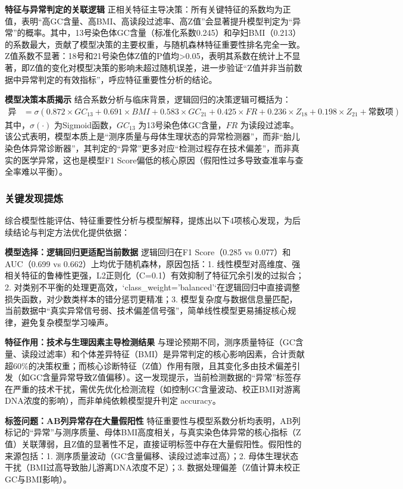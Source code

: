 \documentclass[withoutpreface,bwprint]{cumcmthesis} %
\begin{document}
\textbf{特征与异常判定的关联逻辑}
正相关特征主导决策：所有关键特征的系数均为正值，表明“高GC含量、高BMI、高读段过滤率、高Z值”会显著提升模型判定为“异常”的概率。其中，13号染色体GC含量（标准化系数0.245）和孕妇BMI（0.213）的系数最大，贡献了模型决策的主要权重，与随机森林特征重要性排名完全一致。  
Z值系数不显著：18号和21号染色体Z值的P值均>0.05，表明其系数在统计上不显著，即Z值的变化对模型决策的影响未超过随机误差，进一步验证“Z值并非当前数据中异常判定的有效指标”，呼应特征重要性分析的结论。


\textbf{模型决策本质揭示}
结合系数分析与临床背景，逻辑回归的决策逻辑可概括为：  
\begin{align}
\text{异常概率} &= \sigma( 0.872 \times GC_{13} + 0.691 \times BMI + 0.583 \times GC_{21} + 0.425 \times FR + 0.236 \times Z_{18} + 0.198 \times Z_{21} + \text{常数项} )
\end{align}
其中，\( \sigma(\cdot) \) 为Sigmoid函数，\( GC_{13} \) 为13号染色体GC含量，\( FR \) 为读段过滤率。该公式表明，模型本质上是“测序质量与母体生理状态的异常检测器”，而非“胎儿染色体异常诊断器”，其判定的“异常”更多对应“检测过程存在技术偏差”，而非真实的医学异常，这也是模型F1 Score偏低的核心原因（假阳性过多导致查准率与查全率难以平衡）。


\subsubsection{关键发现提炼}
综合模型性能评估、特征重要性分析与模型解释，提炼出以下4项核心发现，为后续结论与判定方法优化提供依据：

\textbf{模型选择：逻辑回归更适配当前数据}
逻辑回归在F1 Score（0.285 vs 0.077）和AUC（0.699 vs 0.662）上均优于随机森林，原因包括：1. 线性模型对高维度、强相关特征的鲁棒性更强，L2正则化（C=0.1）有效抑制了特征冗余引发的过拟合；2. 对类别不平衡的处理更高效，`class\_weight='balanced'`在逻辑回归中直接调整损失函数，对少数类样本的错分惩罚更精准；3. 模型复杂度与数据信息量匹配，当前数据中“真实异常信号弱、技术偏差信号强”，简单线性模型更易捕捉核心规律，避免复杂模型学习噪声。

\textbf{特征作用：技术与生理因素主导检测结果}
与理论预期不同，测序质量特征（GC含量、读段过滤率）和个体差异特征（BMI）是异常判定的核心影响因素，合计贡献超60\%的决策权重；而核心诊断特征（Z值）作用有限，且其变化多由技术偏差引发（如GC含量异常导致Z值偏移）。这一发现提示，当前检测数据的“异常”标签存在严重的技术干扰，需优先优化检测流程（如控制GC含量波动、校正BMI对游离DNA浓度的影响），而非单纯依赖模型提升判定 accuracy。

\textbf{标签问题：AB列异常存在大量假阳性}
特征重要性与模型系数分析均表明，AB列标记的“异常”与测序质量、母体BMI高度相关，与真实染色体异常的核心指标（Z值）关联薄弱，且Z值的显著性不足，直接证明标签中存在大量假阳性。假阳性的来源包括：1. 测序质量波动（GC含量偏移、读段过滤率过高）；2. 母体生理状态干扰（BMI过高导致胎儿游离DNA浓度不足）；3. 数据处理偏差（Z值计算未校正GC与BMI影响）。
\end{document}
